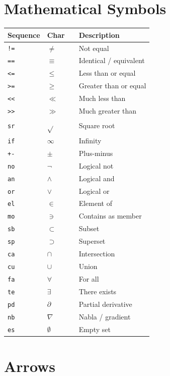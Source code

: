 \section{Mathematical Symbols}

\begin{longtable}{@{}llll@{}}
\toprule
Sequence & Char & & Description \\
\midrule
\endhead
\texttt{!=} & $\neq$ & & Not equal \\
\texttt{==} & $\equiv$ & & Identical / equivalent \\
\texttt{<=} & $\leq$ & & Less than or equal \\
\texttt{>=} & $\geq$ & & Greater than or equal \\
\texttt{<<} & $\ll$ & & Much less than \\
\texttt{>>} & $\gg$ & & Much greater than \\
\texttt{sr} & $\sqrt{}$ & & Square root \\
\texttt{if} & $\infty$ & & Infinity \\
\texttt{+-} & $\pm$ & & Plus-minus \\
\texttt{no} & $\neg$ & & Logical not \\
\texttt{an} & $\wedge$ & & Logical and \\
\texttt{or} & $\vee$ & & Logical or \\
\texttt{el} & $\in$ & & Element of \\
\texttt{mo} & $\ni$ & & Contains as member \\
\texttt{sb} & $\subset$ & & Subset \\
\texttt{sp} & $\supset$ & & Superset \\
\texttt{ca} & $\cap$ & & Intersection \\
\texttt{cu} & $\cup$ & & Union \\
\texttt{fa} & $\forall$ & & For all \\
\texttt{te} & $\exists$ & & There exists \\
\texttt{pd} & $\partial$ & & Partial derivative \\
\texttt{nb} & $\nabla$ & & Nabla / gradient \\
\texttt{es} & $\emptyset$ & & Empty set \\
\bottomrule
\end{longtable}

\section{Arrows}

